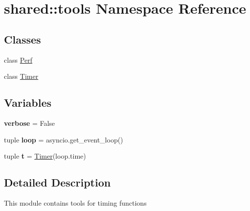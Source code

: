 \hypertarget{namespaceshared_1_1tools}{\section{shared\-:\-:tools \-Namespace \-Reference}
\label{namespaceshared_1_1tools}
}
\subsection*{\-Classes}
\begin{DoxyCompactItemize}
\item 
class \hyperlink{classshared_1_1tools_1_1_perf}{\-Perf}
\item 
class \hyperlink{classshared_1_1tools_1_1_timer}{\-Timer}
\end{DoxyCompactItemize}
\subsection*{\-Variables}
\begin{DoxyCompactItemize}
\item 
\hypertarget{namespaceshared_1_1tools_a62ad31e0888678650ef45b3d2fc3776d}{{\bfseries verbose} = \-False}\label{namespaceshared_1_1tools_a62ad31e0888678650ef45b3d2fc3776d}

\item 
\hypertarget{namespaceshared_1_1tools_a4ac14c00d0484983f2fc2a8e99cea530}{tuple {\bfseries loop} = asyncio.\-get\-\_\-event\-\_\-loop()}\label{namespaceshared_1_1tools_a4ac14c00d0484983f2fc2a8e99cea530}

\item 
\hypertarget{namespaceshared_1_1tools_a8bf3c7adafe3b612e569a32aed45044a}{tuple {\bfseries t} = \hyperlink{classshared_1_1tools_1_1_timer}{\-Timer}(loop.\-time)}\label{namespaceshared_1_1tools_a8bf3c7adafe3b612e569a32aed45044a}

\end{DoxyCompactItemize}


\subsection{\-Detailed \-Description}
\begin{DoxyVerb}
    This module contains tools for timing functions
\end{DoxyVerb}
 